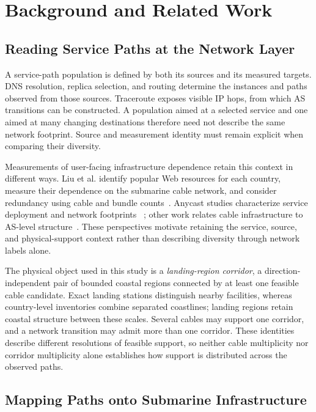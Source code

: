 \section{Background and Related Work}
\label{sec:background}

\subsection{Reading Service Paths at the Network Layer}
\label{sec:background_cross_layer}

A service-path population is defined by both its sources and its measured
targets. DNS resolution, replica selection, and routing determine the
instances and paths observed from those sources. Traceroute exposes visible
IP hops, from which AS transitions can be constructed. A population aimed
at a selected service and one aimed at many changing destinations therefore
need not describe the same network footprint. Source and measurement
identity must remain explicit when comparing their diversity.

Measurements of user-facing infrastructure dependence retain this context
in different ways. Liu et al. identify popular Web resources for each
country, measure their dependence on the submarine cable network, and
consider redundancy using cable and bundle counts~\cite{liu2020outofsight}.
Anycast studies characterize service deployment and network footprints
~\cite{cicalese2015anycast,devries2017anycast}; other work relates cable
infrastructure to AS-level structure~\cite{ye2023impact}. These perspectives
motivate retaining the service, source, and physical-support context rather
than describing diversity through network labels alone.

The physical object used in this study is a \emph{landing-region corridor},
a direction-independent pair of bounded coastal regions connected by at
least one feasible cable candidate. Exact landing stations distinguish
nearby facilities, whereas country-level inventories combine separated
coastlines; landing regions retain coastal structure between these scales.
Several cables may support one corridor, and a network transition may admit
more than one corridor. These identities describe different resolutions of
feasible support, so neither cable multiplicity nor corridor multiplicity
alone establishes how support is distributed across the observed paths.

\subsection{Mapping Paths onto Submarine Infrastructure}
\label{sec:background_existing_work}


